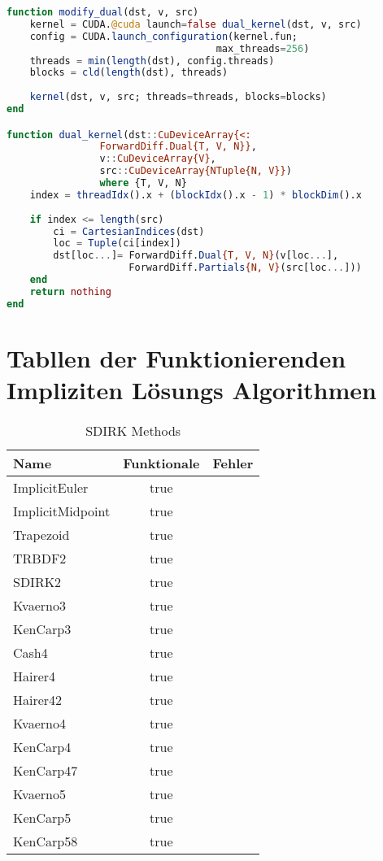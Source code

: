 \begin{lstlisting}[language=Julia]
function modify_dual(dst, v, src)
    kernel = CUDA.@cuda launch=false dual_kernel(dst, v, src)
    config = CUDA.launch_configuration(kernel.fun; 
                                    max_threads=256)
    threads = min(length(dst), config.threads)
    blocks = cld(length(dst), threads)
    
    kernel(dst, v, src; threads=threads, blocks=blocks)
end

function dual_kernel(dst::CuDeviceArray{<: 
                ForwardDiff.Dual{T, V, N}}, 
                v::CuDeviceArray{V}, 
                src::CuDeviceArray{NTuple{N, V}}) 
                where {T, V, N}
    index = threadIdx().x + (blockIdx().x - 1) * blockDim().x
   
    if index <= length(src)
        ci = CartesianIndices(dst)
        loc = Tuple(ci[index])
        dst[loc...]= ForwardDiff.Dual{T, V, N}(v[loc...], 
                     ForwardDiff.Partials{N, V}(src[loc...]))
    end
    return nothing
end
\end{lstlisting}

\newpage

\section{Tabllen der Funktionierenden Impliziten Lösungs Algorithmen}
\label{solver_tabels}

\begin{table}[H]
    \centering
    
    \begin{tabular}{p{5cm}|c|p{5cm}}
        Name             & Funktionale & Fehler \\
        \hline\hline        
        ImplicitEuler    & true        & \\ 
        ImplicitMidpoint & true        & \\ 
        Trapezoid        & true        & \\ 
        TRBDF2           & true        & \\ 
        SDIRK2           & true        & \\ 
        Kvaerno3         & true        & \\ 
        KenCarp3         & true        & \\ 
        Cash4            & true        & \\ 
        Hairer4          & true        & \\ 
        Hairer42         & true        & \\ 
        Kvaerno4         & true        & \\ 
        KenCarp4         & true        & \\ 
        KenCarp47        & true        & \\ 
        Kvaerno5         & true        & \\ 
        KenCarp5         & true        & \\ 
        KenCarp58        & true        & \\       
    \end{tabular}
    \caption{SDIRK Methods}
    \label{tab:my_label}
\end{table}

